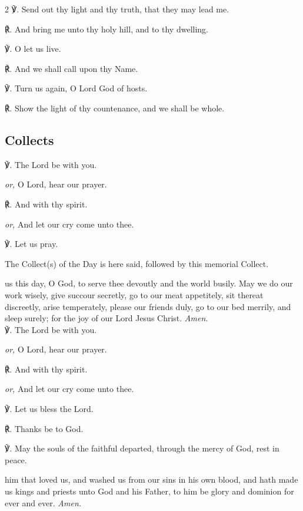 \begin{multicols}{2}
℣. Send out thy light and thy truth, that they may lead me.

℟. And bring me unto thy holy hill, and to thy dwelling.

℣. O let us live.

℟. And we shall call upon thy Name.

℣. Turn us again, O Lord God of hosts.

℟. Show the light of thy countenance, and we shall be whole.


\subsection{Collects}


℣. The Lord be with you.\par
\textit{or,} O Lord, hear our prayer.

℟. And with thy spirit.\par
\textit{or,} And let our cry come unto thee.

℣. Let us pray.

\begin{rubric}
	The Collect(s) of the Day is here said, followed by this memorial Collect.
\end{rubric}

 us this day, O God, to serve thee devoutly and the world busily. May we do our work wisely, give succour secretly, go to our meat appetitely, sit thereat discreetly, arise temperately, please our friends duly, go to our bed merrily, and sleep surely; for the joy of our Lord Jesus Christ. \textit{Amen.}\\

℣. The Lord be with you.\par
\textit{or,} O Lord, hear our prayer.\par
℟. And with thy spirit.\par
\textit{or,} And let our cry come unto thee.\par
℣. Let us bless the Lord.\par
℟. Thanks be to God.\par


℣. May the souls {} of the faithful departed, through the mercy of God, rest in peace.

 him that loved us, and washed us from our sins in his own blood, and hath made us kings and priests unto God and his Father, to him be glory and dominion for ever and ever. \textit{Amen.}

\end{multicols}

